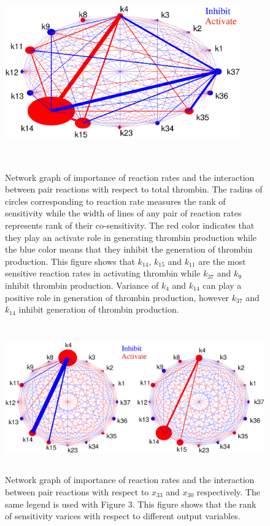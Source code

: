 \begin{figure}
\begin{center}
\includegraphics[width=4in,height=3in]{figures/NSA.eps}
\caption{Network graph of importance of reaction rates and the
interaction between pair reactions with respect to total thrombin.
The radius of circles corresponding to reaction rate measures the
rank of sensitivity while the width of lines of any pair of reaction
rates represents rank of their co-sensitivity. The red color
indicates that they play an activate role in generating thrombin
production while the blue color means that they inhibit the
generation of thrombin production. This figure shows that $k_{14}$,
$k_{15}$ and $k_{11}$ are the most sensitive reaction rates in
activating thrombin while $k_{37}$ and $k_{9}$ inhibit thrombin
production. Variance of $k_4$ and $k_{14}$ can play a positive role
in generation of thrombin production, however $k_{37}$ and $k_{14}$
inhibit generation of thrombin production.  } \label{fig:NSA1}

\includegraphics[width=5in,height=2.5in]{figures/nsarb33.eps}
\caption{Network graph of importance of reaction rates and the
interaction between pair reactions with respect to $x_{33}$ and
$x_{30}$ respectively. The same legend is used with Figure 3. This
figure shows that the rank of sensitivity varices with respect to
different output variables. } \label{fig:NSA}


\end{center}
\end{figure}

